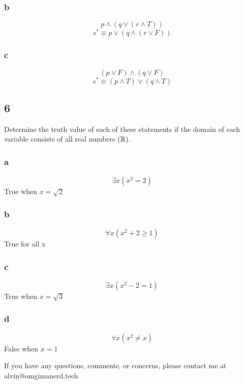\documentclass{math}
\begin{document}
\subsubsection*{b}
\[ p \wedge (q \vee (r \wedge T)) \]
\[ s^{*} \equiv p \vee (q \wedge (r \vee F)) \]

\subsubsection*{c}
\[ (p \vee F) \wedge (q \vee F) \]
\[ s^{*} \equiv (p \wedge T) \vee (q \wedge T) \]

\subsection*{6}
Determine the truth value of each of these statements if the domain of each
variable consists of all real numbers \( (\mathbb{R}) \).

\subsubsection*{a}
\[ \exists{x}(x^{2} = 2) \]
True when \( x = \sqrt{2} \)

\subsubsection*{b}
\[ \forall{x}(x^{2}+2 \geq 1) \]
True for all x

\subsubsection*{c}
\[ \exists{x}(x^{2}-2 = 1) \]
True when \( x = \sqrt{3} \)

\subsubsection*{d}
\[ \forall{x}(x^{2} \neq x) \]
False when \( x = 1 \)

\begin{center}
  If you have any questions, comments, or concerns, please contact me at
  alvin@omgimanerd.tech
\end{center}
\end{document}
